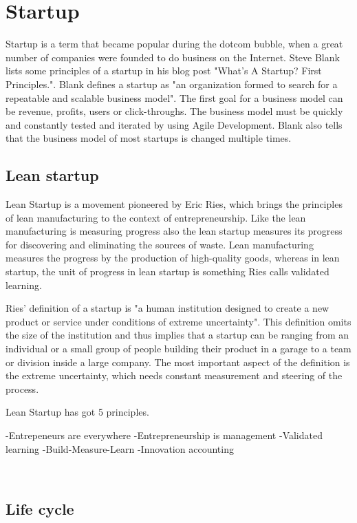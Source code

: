 
 \section{Startup}

Startup is a term that became popular during the dotcom bubble, when a great number of companies were founded to do business on the Internet. Steve Blank lists some principles of a startup in his blog post "What’s A Startup? First Principles.". Blank defines a startup as "an organization formed to search for a repeatable and scalable business model". The first goal for a business model can be revenue, profits, users or click-throughs. The business model must be quickly and constantly tested and iterated by using Agile Development. Blank also tells that the business model of most startups is changed multiple times.~\cite{blank2010startup}

 \subsection{Lean startup}
 
Lean Startup is a movement pioneered by Eric Ries, which brings the principles of lean manufacturing to the context of entrepreneurship. Like the lean manufacturing is measuring progress also the lean startup measures its progress for discovering and eliminating the sources of waste. Lean manufacturing measures the progress by the production of high-quality goods, whereas in lean startup, the unit of progress in lean startup is something Ries calls validated learning.

Ries' definition of a startup is "a human institution designed to create a new product or service under conditions of extreme uncertainty". This definition omits the size of the institution and thus implies that a startup can be ranging from an individual or a small group of people building their product in a garage to a team or division inside a large company. The most important aspect of the definition is the extreme uncertainty, which needs constant measurement and steering of the process.

Lean Startup has got 5 principles. 


-Entrepeneurs are everywhere
-Entrepreneurship is management
-Validated learning
-Build-Measure-Learn
-Innovation accounting

~\cite{ries2011lean}

 \subsection{Life cycle}

